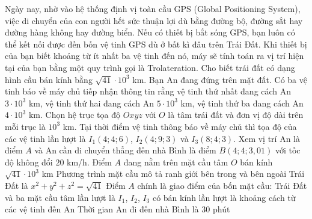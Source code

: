 \begin{ex}%
	Ngày nay, nhờ vào hệ thống định vị toàn cầu GPS (Global Positioning System), việc di chuyển của con người hết sức thuận lợi dù bằng đường bộ, đường sắt hay đường hàng không hay đường biển. Nếu có thiết bị bắt sóng GPS, bạn luôn có thể kết nối được đến bốn vệ tinh GPS dù ở bất kì đâu trên Trái Đất. Khi thiết bị của bạn biết khoảng từ ít nhất ba vệ tinh đến nó, máy sẽ tính toán ra vị trí hiện tại của bạn bằng một quy trình gọi là Trolateration. Cho biết trái đất có dạng hình cầu bán kính bằng $\sqrt{41}\cdot10^{3}$ km. Bạn An đang đứng trên mặt đất. Có ba vệ tinh báo về máy chủ tiếp nhận  thông tin rằng vệ tinh thứ nhất đang cách An $3\cdot10^{3}$ km, vệ tinh thứ hai đang cách An $5\cdot10^{3}$ km, vệ tinh thứ ba đang cách An $4\cdot10^{3}$ km. Chọn hệ trục tọa độ $Oxyz$ với $O$ là tâm trái đất và đơn vị độ dài trên mỗi trục là $10^3$ km. Tại thời điểm vệ tinh thông báo về máy chủ thì tọa độ của các vệ tinh lần lượt là $I_1\left(4;4;6\right)$, $I_2\left(4;9;3\right)$ và $I_3\left(8;4;3\right)$. Xem vị trí An là điểm $A$ và An cần di chuyển thẳng đến nhà Bình là điểm $B\left(4;4;3{,}01\right)$ với tốc độ không đổi $20$ km/h.
	 \choiceTF
		{\True Điểm $A$ đang nằm trên mặt  cầu tâm $O$ bán kính $\sqrt{41}\cdot10^3$ km}
		{Phương  trình mặt cầu mô tả ranh giới bên trong và bên ngoài Trái Đất là
		$x^2+y^2+z^2=\sqrt{41}$} 
		{\True Điểm $A$ chính là giao điểm của bốn mặt cầu: Trái Đất và ba mặt cầu tâm lần lượt là  $I_1$, $I_2$, $I_3$ có bán kính lần lượt là khoảng cách từ các vệ tinh đến An}
		{Thời gian An đi đến nhà Bình là $30$  phút}
\end{ex}
